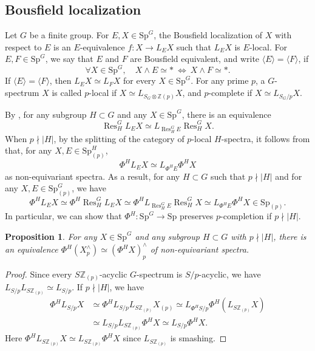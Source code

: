 \documentclass{amsart}
\theoremstyle{plain}
\newtheorem{proposition}[theorem]{Proposition}
\theoremstyle{definition}
\theoremstyle{remark}
\begin{document}
\subsection{Bousfield localization} 
Let $G$ be a finite group. For $E,X\in \mathrm{Sp}^G$, the Bousfield localization of $X$ with respect to $E$ is an $E$-equivalence $f:X\to L_EX$ such that $L_EX$ is $E$-local.  For $E,F\in \mathrm{Sp}^G$, we say that $E$ and $F$ are Bousfield equivalent, and write $\langle E\rangle=\langle F\rangle$, if
\[
\forall X\in \mathrm{Sp}^G, \quad X\wedge E\simeq \ast \ \Longleftrightarrow \  X\wedge F\simeq \ast.
\]
If $\langle E\rangle=\langle F\rangle$, then $L_EX\simeq L_FX$ for every $X\in \mathrm{Sp}^G$. For any prime $p$, a $G$-spectrum $X$ is called $p$-local if $X\simeq L_{S_G\otimes\mathbb{Z}{(p)}}X$, and $p$-complete if $X\simeq L_{S_G/p}X$.



    By \cite[Proposition 3.2]{carrick2022smashing}, for any subgroup $H\subset G$ and any $X\in \mathrm{Sp}^G$, there is an equivalence
    \[
        \operatorname{Res}_H^G L_EX\simeq L_{\operatorname{Res}_H^G E} \operatorname{Res}_H^G X. 
    \]
    When $p\nmid |H|$, by the splitting of the category of $p$-local $H$-spectra, it follows from \cite[Proposition 8.5]{bonventre2022ku_g} that, for any $X,E\in \mathrm{Sp}^H_{(p)}$,
    \[
        \Phi^H L_E X\simeq L_{\Phi^H E} \Phi^H X
    \]
    as non-equivariant spectra.
    As a result, for any $H\subset G$ such that $p\nmid |H|$ and for any $X, E\in \mathrm{Sp}^G_{(p)}$, we have 
    \[\Phi^H L_EX\simeq \Phi^H \operatorname{Res}_H^GL_EX\simeq  \Phi^H L_{\operatorname{Res}_H^G E}\operatorname{Res}_H^G X\simeq L_{\Phi^H E}\Phi^H X \in \mathrm{Sp}_{(p)}.\]
In particular, we can show that $\Phi^H: \mathrm{Sp}^G\to \mathrm{Sp}$ preserves $p$-completion if $p\nmid |H|$.
\begin{proposition}\label{prop:q local geometric fixed points}
    For any $X\in \mathrm{Sp}^G$ and any subgroup $H\subset G$ with $p\nmid |H|$, there is an equivalence $\Phi^H (X_p^\wedge)\simeq (\Phi^H X)_p^\wedge$ of non-equivariant spectra. 
\end{proposition}
\begin{proof}
    Since every $S\mathbb{Z}_{(p)}$-acyclic $G$-spectrum is $S/p$-acyclic, we have $L_{S/p}L_{S\mathbb{Z}_{(p)}}\simeq L_{S/p}$. If $p\nmid |H|$, we  have 
    \[
    \begin{aligned}
        \Phi^H L_{S/p}X & \simeq \Phi^H L_{S/p} L_{S\mathbb{Z}_{(p)}}X_{(p)} \simeq L_{\Phi^H S/p} \Phi^H(L_{S\mathbb{Z}_{(p)}}X)\\
        & \simeq L_{S/p} L_{S\mathbb{Z}_{(p)}}\Phi^H X\simeq L_{S/p} \Phi^H X.
    \end{aligned} 
    \]
    Here $\Phi^H L_{S\mathbb{Z}_{(p)}}X\simeq L_{S\mathbb{Z}_{(p)}}\Phi^H X$ since $L_{S\mathbb{Z}_{(p)}}$ is smashing.
\end{proof}
\end{document}
